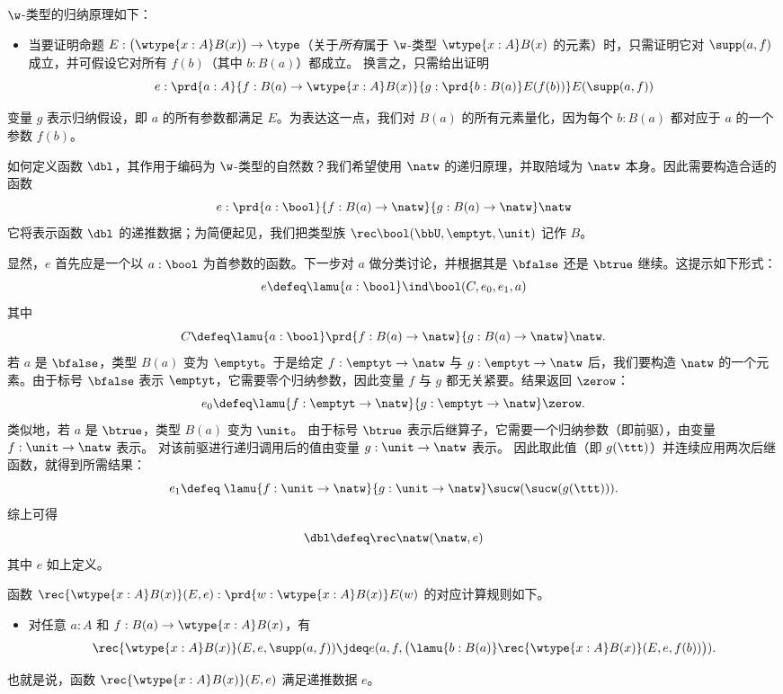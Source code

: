 %
$\w$-类型的归纳原理如下：
\begin{itemize}
\item 当要证明命题 $E : \big(\wtype{x:A} B(x)\big) \to \type$（关于\emph{所有}属于 $\w$-类型 $\wtype{x:A} B(x)$ 的元素）时，只需证明它对 $\supp(a,f)$ 成立，并可假设它对所有 $f(b)$（其中 $b : B(a)$）都成立。
换言之，只需给出证明
\begin{equation*}
e : \prd{a:A}{f : B(a) \to \wtype{x:A} B(x)}{g : \prd{b : B(a)} E(f(b))} E(\supp(a,f))
\end{equation*}
\end{itemize}

%
变量 $g$ 表示归纳假设，即 $a$ 的所有参数都满足 $E$。为表达这一点，我们对 $B(a)$ 的所有元素量化，因为每个 $b : B(a)$ 都对应于 $a$ 的一个参数 $f(b)$。

如何定义函数 $\dbl$，其作用于编码为 $\w$-类型的自然数？我们希望使用 $\natw$ 的递归原理，并取陪域为 $\natw$ 本身。因此需要构造合适的函数
\[e : \prd{a : \bool}{f : B(a) \to \natw}{g : B(a) \to \natw} \natw\]
它将表示函数 $\dbl$ 的递推数据；为简便起见，我们把类型族 $\rec\bool(\bbU,\emptyt,\unit)$ 记作 $B$。

显然，$e$ 首先应是一个以 $a : \bool$ 为首参数的函数。下一步对 $a$ 做分类讨论，并根据其是 $\bfalse$ 还是 $\btrue$ 继续。这提示如下形式：
\[ e \defeq \lamu{a:\bool} \ind\bool(C,e_0,e_1,a) \]
其中
\[C \defeq \lamu{a:\bool} \prd{f : B(a) \to \natw}{g : B(a) \to \natw} \natw.\]
若 $a$ 是 $\bfalse$，类型 $B(a)$ 变为 $\emptyt$。于是给定 $f : \emptyt \to \natw$ 与 $g : \emptyt \to \natw$ 后，我们要构造 $\natw$ 的一个元素。由于标号 $\bfalse$ 表示 $\emptyt$，它需要零个归纳参数，因此变量 $f$ 与 $g$ 都无关紧要。结果返回 $\zerow$：
\[ e_0 \defeq \lamu{f:\emptyt \to \natw}{g:\emptyt \to \natw} \zerow. \]
类似地，若 $a$ 是 $\btrue$，类型 $B(a)$ 变为 $\unit$。
由于标号 $\btrue$ 表示后继算子，它需要一个归纳参数（即前驱），由变量 $f : \unit \to \natw$ 表示。
对该前驱进行递归调用后的值由变量 $g : \unit \to \natw$ 表示。
因此取此值（即 $g(\ttt)$）并连续应用两次后继函数，就得到所需结果：
\begin{equation*}
e_1 \defeq \; \lamu{f:\unit \to \natw}{g:\unit \to \natw} \sucw(\sucw(g(\ttt))).
\end{equation*}
综上可得
\[ \dbl \defeq \rec\natw(\natw, e) \]
其中 $e$ 如上定义。

函数 $\rec{\wtype{x:A} B(x)}(E,e) : \prd{w : \wtype{x:A} B(x)} E(w)$ 的对应计算规则如下。
%
\begin{itemize}
\item
  对任意 $a : A$ 和 $f : B(a) \to \wtype{x:A} B(x)$，有
  \begin{equation*}
    \rec{\wtype{x:A} B(x)}(E,e,\supp(a,f)) \jdeq
    e(a,f,\big(\lamu{b:B(a)} \rec{\wtype{x:A} B(x)}(E,e,f(b))\big)).
  \end{equation*}
\end{itemize}
也就是说，函数 $\rec{\wtype{x:A} B(x)}(E,e)$ 满足递推数据 $e$。

